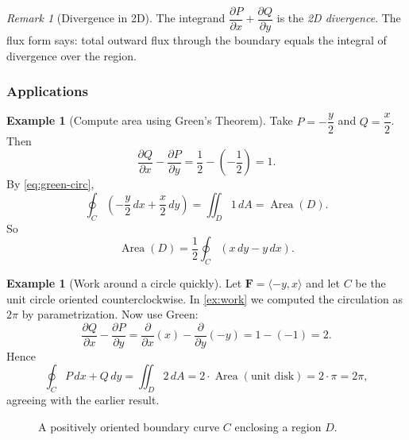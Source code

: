 \documentclass[12pt]{article}
\numberwithin{equation}{section}
\newcommand{\vect}[1]{\boldsymbol{#1}}   %
\theoremstyle{plain}
\theoremstyle{definition}
\newtheorem{example}[theorem]{Example}
\theoremstyle{remark}
\newtheorem{remark}[theorem]{Remark}
\begin{document}
\begin{remark}[Divergence in 2D]
The integrand $\dfrac{\partial P}{\partial x}+\dfrac{\partial Q}{\partial y}$ is the \emph{2D divergence}. The flux form says: total outward flux through the boundary equals the integral of divergence over the region.
\end{remark}

\subsubsection{Applications}

\begin{example}[Compute area using Green's Theorem]\label{ex:area-green}
Take $P=-\dfrac{y}{2}$ and $Q=\dfrac{x}{2}$. Then
\[
\frac{\partial Q}{\partial x}-\frac{\partial P}{\partial y}
=\frac12-\left(-\frac12\right)=1.
\]
By \cref{eq:green-circ},
\[
\oint_C \left(-\frac{y}{2}\,dx+\frac{x}{2}\,dy\right)
=\iint_D 1\,dA=\operatorname{Area}(D).
\]
So
\begin{equation}\label{eq:area-formula}
\operatorname{Area}(D)=\frac12\oint_C (x\,dy-y\,dx).
\end{equation}
\end{example}

\begin{example}[Work around a circle quickly]
Let $\vect F=\langle -y,x\rangle$ and let $C$ be the unit circle oriented counterclockwise. In \cref{ex:work} we computed the circulation as $2\pi$ by parametrization.  
Now use Green:
\[
\frac{\partial Q}{\partial x}-\frac{\partial P}{\partial y}
=\frac{\partial}{\partial x}(x)-\frac{\partial}{\partial y}(-y)=1-(-1)=2.
\]
Hence
\[
\oint_C P\,dx+Q\,dy=\iint_D 2\,dA=2\cdot \operatorname{Area}(\text{unit disk})=2\cdot \pi=2\pi,
\]
agreeing with the earlier result.
\end{example}

\begin{figure}[H]
\centering
{}
\caption{A positively oriented boundary curve $C$ enclosing a region $D$.}
\label{fig:green-setup}
\end{figure}
\end{document}
